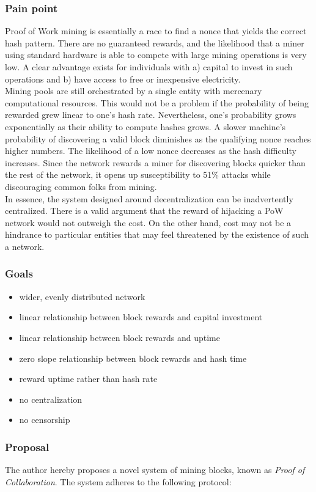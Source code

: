 \documentclass[10pt,twocolumn]{article}
\begin{document}
\subsubsection{Pain point}
Proof of Work mining is essentially a race to find a nonce that yields the correct hash pattern. 
There are no guaranteed rewards, and the likelihood that a miner using standard hardware is able to compete with large mining operations is very low. A clear advantage exists for individuals with a) capital to invest in such operations and b) have access to free or inexpensive electricity. \\
Mining pools are still orchestrated by a single entity with mercenary computational resources.
This would not be a problem if the probability of being rewarded grew linear to one's hash rate. Nevertheless, one’s probability grows exponentially as their ability to compute hashes grows. A slower machine's probability of discovering a valid block diminishes as the qualifying nonce reaches higher numbers. The likelihood of a low nonce decreases as the hash difficulty increases. Since the network rewards a miner for discovering blocks quicker than the rest of the network, it opens up susceptibility to 51\% attacks while discouraging common folks from mining.\\
In essence, the system designed around decentralization can be inadvertently centralized. There is a valid argument that the reward of hijacking a PoW network would not outweigh the cost. On the other hand, cost may not be a hindrance to particular entities that may feel threatened by the existence of such a network.
\subsubsection{Goals}
\begin{itemize}
\item wider, evenly distributed network
\item linear relationship between block rewards and capital investment
\item linear relationship between block rewards and uptime
\item zero slope relationship between block rewards and hash time
\item reward uptime rather than hash rate
\item no centralization
\item no censorship
\end{itemize}
\subsubsection{Proposal}
The author hereby proposes a novel system of mining blocks, known as \textit{Proof of Collaboration}.  The system adheres to the following protocol:
\end{document}

